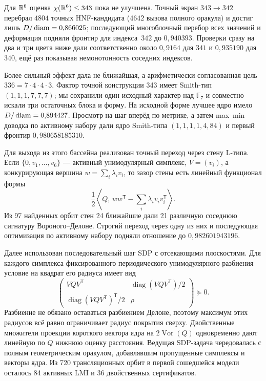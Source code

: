 Для $\mathbb{R}^6$ оценка $\chi(\mathbb{R}^6)\le343$ \cite{ABPR} пока не улучшена. Точный экран
$343\to342$ перебрал $4804$ точных HNF-кандидата ($4642$ вызова полного
оракула) и достиг лишь $D/\operatorname{diam}=0{,}866025$; последующий многоблочный перебор всех значений и деформация
подняли фронтир для индекса~$342$ до $0{,}940393$. Проверки сразу на два и три
цвета ниже дали соответственно около $0{,}9164$ для $341$ и $0{,}935190$ для
$340$, ещё раз показывая немонотонность соседних индексов.

Более сильный эффект дала не ближайшая, а арифметически согласованная цель
$336=7\cdot4\cdot4\cdot3$. Фактор точной конструкции 343 имеет Smith-тип
$(1,1,1,7,7,7)$; мы сохранили один исходный характер над $\mathbb F_7$ и
совместно искали три остаточных блока и форму. На исходной форме лучшее ядро
имело $D/\operatorname{diam}=0{,}894427$. Просмотр на шаг вперёд по метрике, а затем max--min доводка по активному
набору дали ядро Smith-типа $(1,1,1,1,4,84)$ и первый фронтир
$0{,}980658185310$.

Для выхода из этого бассейна реализован точный переход через стену L-типа. Если
$\{0,v_1,\ldots,v_6\}$ --- активный унимодулярный симплекс,
$V=(v_i)$, а конкурирующая вершина $w=\sum_i\lambda_i v_i$, то зазор стены есть линейный функционал формы
\[
 \frac12\left\langle Q,\,
 ww^{\mathsf T}-\sum_i\lambda_i v_i v_i^{\mathsf T}\right\rangle.
\]
Из 97 найденных орбит стен 24 ближайшие дали 21 различную соседнюю
сигнатуру Вороного--Делоне. Строгий переход через одну из них и последующая
оптимизация по активному набору подняли отношение до $0{,}982601943196$.

Далее использован последовательный шаг SDP с отсекающими плоскостями. Для каждого
симплекса фиксированного периодического унимодулярного разбиения условие на
квадрат его радиуса имеет вид
\[
 \begin{pmatrix}
 VQV^{\mathsf T}&\operatorname{diag}(VQV^{\mathsf T})/2\\
 \operatorname{diag}(VQV^{\mathsf T})^{\mathsf T}/2&\rho
 \end{pmatrix}\succeq0.
\]
Разбиение не обязано оставаться разбиением Делоне, поэтому максимум этих радиусов всё
равно ограничивает радиус покрытия сверху. Двойственные множители проекции
короткого вектора ядра на $2\operatorname{Vor}(Q)$ одновременно дают линейную по $Q$
нижнюю оценку расстояния. Ведущая SDP-задача чередовалась с полным геометрическим
оракулом, добавлявшим пропущенные симплексы и векторы ядра. Из 720
трансляционных орбит в первой сошедшейся модели осталось 84 активных LMI и 36
двойственных сертификатов.

